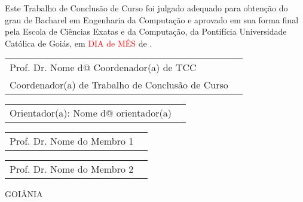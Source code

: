 \begin{center}
    \authorname
    \textbf{\titletcc}
\end{center}

\noindent Este Trabalho de Conclusão de Curso foi julgado 
adequado para obtenção do grau de Bacharel em Engenharia da 
Computação e aprovado em sua forma final pela Escola de 
Ciências Exatas e da Computação, da Pontifícia Universidade 
Católica de Goiás, em \textcolor{red}{DIA de MÊS} de \the\year.

\begin{flushright}
    \begin{tabular}[j]{p{9.8cm}p{8.9cm}}
        \cline{1-1} \vspace{0.1px} \centering
        Prof. Dr. Nome d@ Coordenador(a) de TCC \\
        Coordenador(a) de Trabalho de Conclusão de Curso \\
    \end{tabular}
\end{flushright}

\newline

\begin{flushright}
    \begin{tabular}[j]{p{9.8cm}p{8.9cm}}
        \cline{1-1} \vspace{0.1px} \centering
        Orientador(a): Nome d@ orientador(a) \\
    \end{tabular}
\end{flushright}

\vspace{5px}
    
\begin{flushright}
    \begin{tabular}[j]{p{9.8cm}p{8.9cm}}
        \cline{1-1} \vspace{0.1px} \centering
        Prof. Dr. Nome do Membro 1 \\
    \end{tabular}
\end{flushright}

\vspace{5px}

\begin{flushright}
    \begin{tabular}[j]{p{9.8cm}p{8.9cm}}
        \cline{1-1} \vspace{0.1px} \centering
        Prof. Dr. Nome do Membro 2 \\
    \end{tabular}
\end{flushright}

\begin{center}
    \begin{bottompar}
        GOIÂNIA \\ \vspace{1mm}
        \the\year
    \end{bottompar}
\end{center}